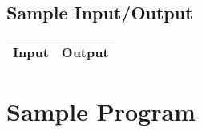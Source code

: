 \documentclass[12pt]{report}
\begin{document}
	\subsection*{Sample Input/Output}
	\begin{tabular}{ |l|l| } 
		\hline
		\textbf{Input} & \textbf{Output} \\
		\hline
	\end{tabular}

\section*{Sample Program}
	
	
\end{document}
